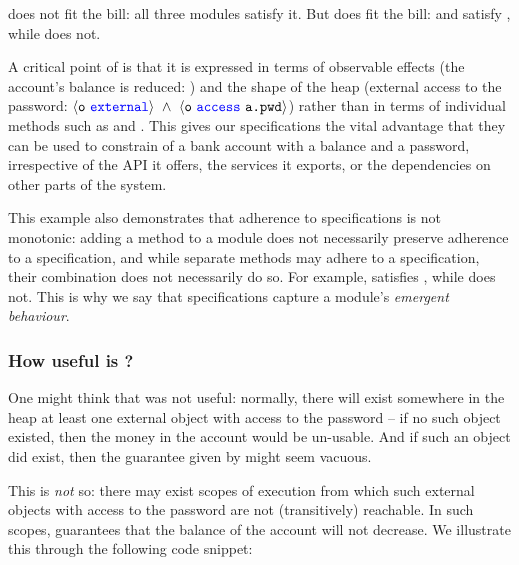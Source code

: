 
{\SrobustA does not fit the bill: all three modules   satisfy  it.
 But  \SrobustB does fit the bill: \ModA and \ModC satisfy \SrobustB, while \ModB does not.}
 
A critical point of \SrobustB %
is that it is
expressed in terms of observable effects (the account's balance is
reduced: ) and the shape of the heap 
(external access to the password:
$\external{\prg{o}}\ \wedge\ \access{\prg{o}}{\prg{a.pwd}}$) 
rather than in terms of individual methods such as
 and .
This gives our specifications the
vital advantage that they can be used to constrain
 of a bank account with a balance and a
password, irrespective of the API it
offers, the services it exports, or the dependencies on other parts of
the system.

 This example also demonstrates that 
adherence to   \Nec specifications is not monotonic:
adding a method to a module does not necessarily preserve adherence to
a specification, 
and while separate methods may adhere to a  specification, their combination does
not necessarily do so. 
{For example, \ModA satisfies \SrobustB, while \ModB does not.}
This is why we say that \Nec   specifications capture a module's \emph{emergent behaviour}. 
 

\subsubsection{How  useful is  \SrobustB?}
\label{sec:how}

{One might think that \SrobustB was not useful: normally, there will exist somewhere in the heap
at least one external object  
with access to the password --  if no such object existed, then the money in the account would be un-usable. 
And if such an object did exist, then the guarantee given by \SrobustB might seem vacuous.}

{
This is \emph{not} so: there may exist  
scopes of execution  from which such external objects with access to the password
are not (transitively) reachable. In such scopes,
\SrobustB  guarantees that the balance of the account will not decrease.
}
We illustrate this through the following  code snippet:
 

